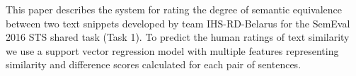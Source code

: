 This paper describes the system for rating the degree of semantic equivalence between two text snippets developed by team IHS-RD-Belarus for the SemEval 2016 STS shared task (Task 1). To predict the human ratings of text similarity we use a support vector regression model with multiple features representing similarity and difference scores calculated for each pair of sentences.
